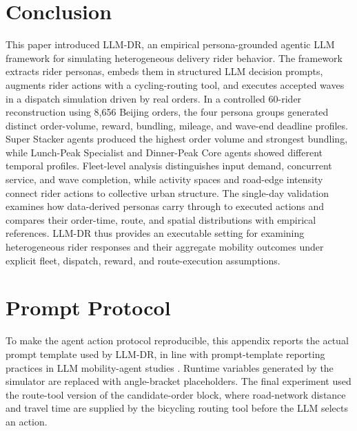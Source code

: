 \documentclass[letterpaper,journal]{IEEEtran}
\begin{document}
\section{Conclusion}
This paper introduced LLM-DR, an empirical persona-grounded agentic LLM framework for simulating heterogeneous delivery rider behavior. The framework extracts rider personas, embeds them in structured LLM decision prompts, augments rider actions with a cycling-routing tool, and executes accepted waves in a dispatch simulation driven by real orders. In a controlled 60-rider reconstruction using 8,656 Beijing orders, the four persona groups generated distinct order-volume, reward, bundling, mileage, and wave-end deadline profiles. Super Stacker agents produced the highest order volume and strongest bundling, while Lunch-Peak Specialist and Dinner-Peak Core agents showed different temporal profiles. Fleet-level analysis distinguishes input demand, concurrent service, and wave completion, while activity spaces and road-edge intensity connect rider actions to collective urban structure. The single-day validation examines how data-derived personas carry through to executed actions and compares their order-time, route, and spatial distributions with empirical references. LLM-DR thus provides an executable setting for examining heterogeneous rider responses and their aggregate mobility outcomes under explicit fleet, dispatch, reward, and route-execution assumptions.




\clearpage
\appendices
\section{Prompt Protocol}
To make the agent action protocol reproducible, this appendix reports the actual prompt template used by LLM-DR, in line with prompt-template reporting practices in LLM mobility-agent studies \cite{wangLargeLanguageModels2024}. Runtime variables generated by the simulator are replaced with angle-bracket placeholders. The final experiment used the route-tool version of the candidate-order block, where road-network distance and travel time are supplied by the bicycling routing tool before the LLM selects an action.

\smallskip
\noindent{}
\end{document}
